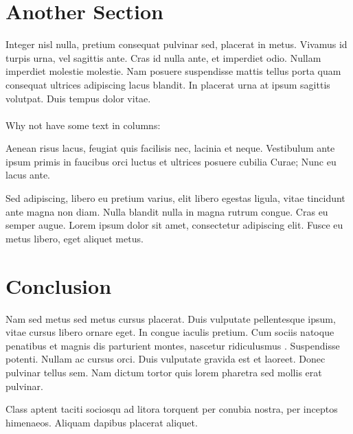 \documentclass[12pt,a4paper]{article}
\begin{document}
\section{Another Section}
\label{sec:2}

Integer nisl nulla, pretium consequat pulvinar sed, placerat in
metus. Vivamus id turpis urna, vel sagittis ante. Cras id nulla ante,
et imperdiet odio. Nullam imperdiet molestie molestie. Nam posuere
suspendisse mattis tellus porta quam consequat ultrices adipiscing
lacus blandit. In placerat urna at ipsum sagittis volutpat. Duis
tempus dolor vitae.
\\\\
Why not have some text in columns:

\setlength{\columnsep}{1cm}
\singlespacing
\begin{multicols}{2}
\noindent  
Aenean risus lacus, feugiat quis facilisis nec, lacinia et
neque. Vestibulum ante ipsum primis in faucibus orci luctus et
ultrices posuere cubilia Curae; Nunc eu lacus ante.

Sed adipiscing, libero eu pretium varius, elit libero egestas ligula,
vitae tincidunt ante magna non diam. Nulla blandit nulla in magna
rutrum congue. Cras eu semper augue. Lorem ipsum dolor sit amet,
consectetur adipiscing elit. Fusce eu metus libero, eget aliquet
metus.
\end{multicols}
\onehalfspacing

\section{Conclusion}
\label{sec:3}
Nam sed metus sed metus cursus placerat. Duis vulputate pellentesque
ipsum, vitae cursus libero ornare eget. In congue iaculis pretium. Cum
sociis natoque penatibus et magnis dis parturient montes, nascetur
ridiculusmus \cite{Commission2002}. Suspendisse potenti. Nullam ac
cursus orci. Duis vulputate gravida est et laoreet. Donec pulvinar
tellus sem. Nam dictum tortor quis lorem pharetra sed mollis erat
pulvinar.

Class aptent taciti sociosqu ad litora torquent per conubia nostra,
per inceptos himenaeos. Aliquam dapibus placerat aliquet. 
\newpage 




\end{document}
